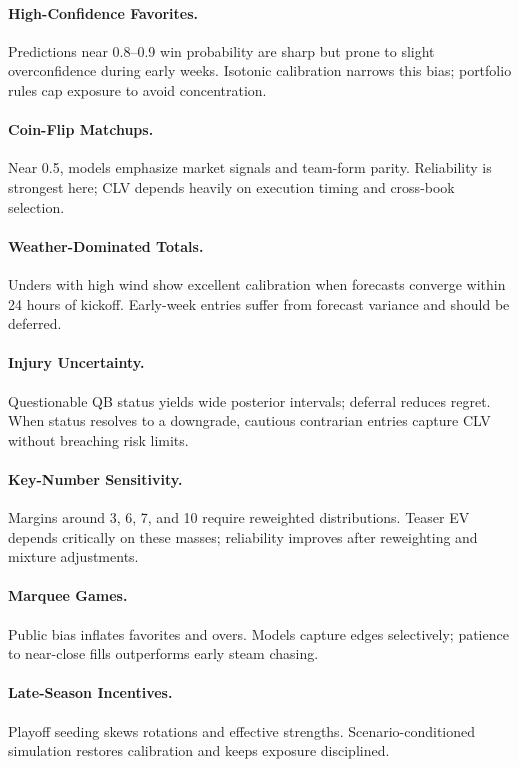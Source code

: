 \paragraph{High-Confidence Favorites.}
Predictions near 0.8–0.9 win probability are sharp but prone to slight overconfidence during early weeks. Isotonic calibration narrows this bias; portfolio rules cap exposure to avoid concentration.

\paragraph{Coin-Flip Matchups.}
Near 0.5, models emphasize market signals and team-form parity. Reliability is strongest here; CLV depends heavily on execution timing and cross-book selection.

\paragraph{Weather-Dominated Totals.}
Unders with high wind show excellent calibration when forecasts converge within 24 hours of kickoff. Early-week entries suffer from forecast variance and should be deferred.

\paragraph{Injury Uncertainty.}
Questionable QB status yields wide posterior intervals; deferral reduces regret. When status resolves to a downgrade, cautious contrarian entries capture CLV without breaching risk limits.

\paragraph{Key-Number Sensitivity.}
Margins around 3, 6, 7, and 10 require reweighted distributions. Teaser EV depends critically on these masses; reliability improves after reweighting and mixture adjustments.

\paragraph{Marquee Games.}
Public bias inflates favorites and overs. Models capture edges selectively; patience to near-close fills outperforms early steam chasing.

\paragraph{Late-Season Incentives.}
Playoff seeding skews rotations and effective strengths. Scenario-conditioned simulation restores calibration and keeps exposure disciplined.

